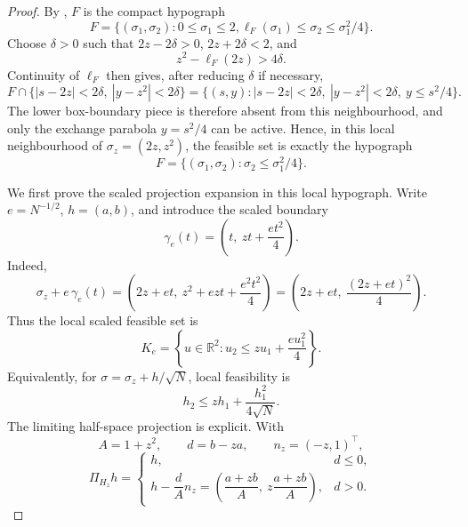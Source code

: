 \begin{proof}
By , \(F\) is the compact
hypograph
\[
F=\{(\sigma_1,\sigma_2):0\le\sigma_1\le2,
\ell_F(\sigma_1)\le\sigma_2\le\sigma_1^2/4\}.
\]
Choose \(\delta>0\) such that \(2z-2\delta>0\), \(2z+2\delta<2\), and
\[
z^2-\ell_F(2z)>4\delta .
\]
Continuity of \(\ell_F\) then gives, after reducing \(\delta\) if necessary,
\[
F\cap\{|s-2z|<2\delta,\ |y-z^2|<2\delta\}
=\{(s,y): |s-2z|<2\delta,\ |y-z^2|<2\delta,\ y\le s^2/4\}.
\]
The lower box-boundary piece is therefore absent from this neighbourhood, and
only the exchange parabola \(y=s^2/4\) can be active.  Hence, in this local
neighbourhood of \(\sigma_z=(2z,z^2)\), the feasible set is exactly the
hypograph
\[
F=\{(\sigma_1,\sigma_2):\sigma_2\le\sigma_1^2/4\}.
\]

We first prove the scaled projection expansion in this local hypograph.
Write \(e=N^{-1/2}\), \(h=(a,b)\), and introduce the scaled boundary
\[
\gamma_e(t)=\left(t,\ zt+\frac{e t^2}{4}\right).
\]
Indeed,
\[
\sigma_z+e\,\gamma_e(t)
=\left(2z+et,\ z^2+ezt+\frac{e^2t^2}{4}\right)
=\left(2z+et,\ \frac{(2z+et)^2}{4}\right).
\]
Thus the local scaled feasible set is
\[
K_e=\left\{u\in\mathbb R^2:
u_2\le zu_1+\frac{e u_1^2}{4}\right\}.
\]
Equivalently, for \(\sigma=\sigma_z+h/\sqrt N\), local feasibility is
\[
h_2\le zh_1+\frac{h_1^2}{4\sqrt N}.
\]
The limiting half-space projection is explicit.  With
\[
A=1+z^2,\qquad d=b-za,\qquad n_z=(-z,1)^\top ,
\]
\[
\Pi_{H_z}h=
\begin{cases}
h,&d\le0,\\[2mm]
h-\dfrac{d}{A}n_z
=\left(\dfrac{a+zb}{A},\ z\dfrac{a+zb}{A}\right),&d>0.
\end{cases}
\]


\end{proof}
